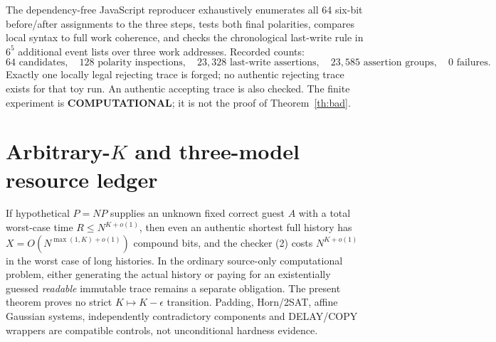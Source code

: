 \documentclass[11pt]{article}
\begin{document}
The dependency-free JavaScript reproducer exhaustively enumerates all 64 six-bit before/after assignments to the three steps, tests both final polarities, compares local syntax to full work coherence, and checks the chronological last-write rule in $6^5$ additional event lists over three work addresses. Recorded counts:
\[
 64\text{ candidates},\quad128\text{ polarity inspections},\quad
 23{,}328\text{ last-write assertions},\quad
 23{,}585\text{ assertion groups},\quad0\text{ failures}.
\]
Exactly one locally legal rejecting trace is forged; no authentic rejecting trace exists for that toy run. An authentic accepting trace is also checked. The finite experiment is \textbf{COMPUTATIONAL}; it is not the proof of Theorem~\ref{th:bad}.

\section{Arbitrary-$K$ and three-model resource ledger}
If hypothetical $P=NP$ supplies an unknown fixed correct guest $A$ with a total worst-case time $R\le N^{K+o(1)}$, then even an authentic shortest full history has $X=O(N^{\max(1,K)+o(1)})$ compound bits, and the checker (2) costs $N^{K+o(1)}$ in the worst case of long histories. In the ordinary source-only computational problem, either generating the actual history or paying for an existentially guessed \emph{readable} immutable trace remains a separate obligation. The present theorem proves no strict $K\mapsto K-\epsilon$ transition. Padding, Horn/2SAT, affine Gaussian systems, independently contradictory components and DELAY/COPY wrappers are compatible controls, not unconditional hardness evidence.
\end{document}
